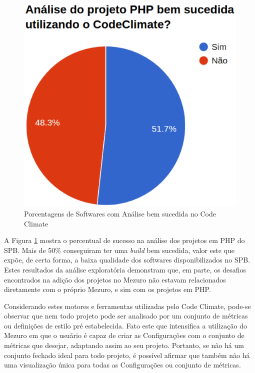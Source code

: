 \begin{figure}[!htb]
	\centering
    \includegraphics[keepaspectratio=true,scale=0.6]
    {figuras/is_codeclimate_php_success.eps}
  \caption{Porcentagens de Softwares com Análise bem sucedida no Code Climate}
  \label{fig:is_codeclimate_php_success}
\end{figure}

A Figura \ref{fig:is_codeclimate_php_success} mostra o percentual de sucesso na
análise dos projetos em PHP do SPB. Mais de 50\% conseguiram ter uma
\textit{build} bem sucedida, valor este que expõe, de certa forma, a baixa
qualidade dos softwares disponibilizados no SPB. Estes resultados da análise
exploratória demonstram que, em parte, os desafios encontrados na adição dos
projetos no Mezuro não estavam relacionados diretamente com o próprio Mezuro, e
sim com os projetos em PHP.

\newpage

Considerando estes motores e ferramentas utilizadas pelo Code Climate, pode-se
observar que nem todo projeto pode ser analisado por um conjunto de métricas ou
definições de estilo pré estabelecida. Fato este que intensifica a utilização do
Mezuro em que o usuário é capaz de criar as Configurações com o conjunto de
métricas que desejar, adaptando assim ao seu projeto. Portanto, se não há um
conjunto fechado ideal para todo projeto, é possível afirmar que também não há
uma visualização única para todas as Configurações ou conjunto de métricas.

